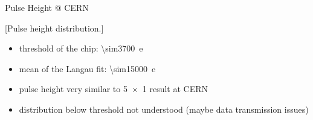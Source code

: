 \begin{frame}{Pulse Height @ CERN}

	\vspace*{-2ex}[Pulse height distribution.]\vspace*{-2ex}
	
	\begin{itemize}\itemfill
		\item threshold of the chip: \SI{\sim3700}{e}
		\item mean of the Langau fit: \SI{\sim15000}{e}
		\item pulse height very similar to \SI{5x1}{} result at CERN
		\item distribution below threshold not understood (maybe data transmission issues)
	\end{itemize}
	
\end{frame}

